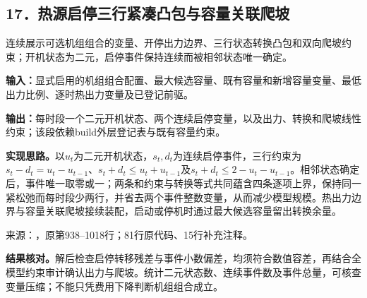 \subsection*{17．热源启停三行紧凑凸包与容量关联爬坡}
连续展示可选机组组合的变量、开停出力边界、三行状态转换凸包和双向爬坡约束；开机状态为二元，启停事件保持连续而被相邻状态唯一确定。

\noindent\textbf{输入：}显式启用的机组组合配置、最大候选容量、既有容量和新增容量变量、最低出力比例、逐时热出力变量及已登记前驱。\par
\noindent\textbf{输出：}每时段一个二元开机状态、两个连续启停变量，以及出力、转换和爬坡线性约束；该段依赖build外层登记表与既有容量约束。\par

\noindent\textbf{实现思路。}以$u_t$为二元开机状态，$s_t,d_t$为连续启停事件，三行约束为$s_t-d_t=u_t-u_{t-1}$、$s_t+d_t\le u_t+u_{t-1}$及$s_t+d_t\le2-u_t-u_{t-1}$。相邻状态确定后，事件唯一取零或一；两条和约束与转换等式共同蕴含四条逐项上界，保持同一紧松弛而每时段少两行，并省去两个事件整数变量，从而减少模型规模。热出力边界与容量关联爬坡接续装配，启动或停机时通过最大候选容量留出转换余量。

{\small 来源：，原第938--1018行；81行原代码、15行补充注释。}\par

\begingroup
{}

\endgroup

\noindent\textbf{结果核对。}解后检查启停转移残差与事件小数偏差，均须符合数值容差，再结合全模型约束审计确认出力与爬坡。统计二元状态数、连续事件数及事件总量，可核查变量压缩；不能只凭费用下降判断机组组合成立。
